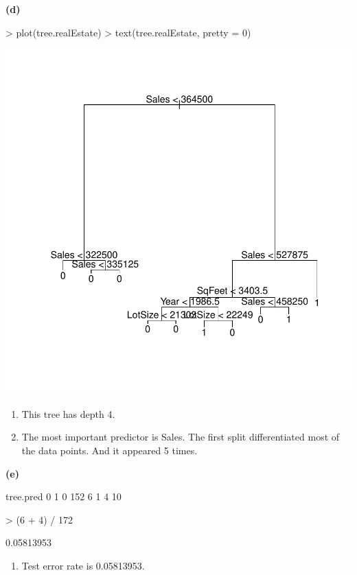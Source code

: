 \documentclass[a4paper]{article}
\renewcommand{\part}[1] {\vspace{.10in} {\bf (#1)}}
\begin{document}
\part{d}
\begin{Schunk}
\begin{Sinput}
> plot(tree.realEstate)
> text(tree.realEstate, pretty = 0)
\end{Sinput}
\end{Schunk}
\includegraphics{tree-1d}
{\color{red}
\begin{enumerate}
\item This tree has depth 4.
\item The most important predictor is Sales. The first split differentiated most of the data points. And it appeared 5 times.
\end{enumerate}
}

\part{e}
\begin{Schunk}
\begin{Soutput}
tree.pred   0   1
        0 152   6
        1   4  10
\end{Soutput}
\begin{Sinput}
> (6 + 4) / 172
\end{Sinput}
\begin{Soutput}
[1] 0.05813953
\end{Soutput}
\end{Schunk}
{\color{red}
\begin{enumerate}
\item Test error rate is 0.05813953.
\end{enumerate}
}
\end{document}
